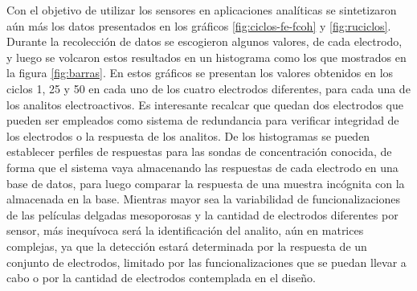 	 Con el objetivo de utilizar los sensores en aplicaciones analíticas se sintetizaron aún más los datos presentados en los gráficos \ref{fig:ciclos-fe-fcoh} y \ref{fig:ruciclos}. Durante la recolección de datos se escogieron algunos valores, de cada electrodo, y luego se volcaron estos resultados en un histograma como los que mostrados en la figura \ref{fig:barras}. En estos gráficos se presentan los valores obtenidos en los ciclos 1, 25 y 50 en cada uno de los cuatro electrodos diferentes, para cada una de los analitos electroactivos. Es interesante recalcar que quedan dos electrodos que pueden ser empleados como sistema de redundancia para verificar integridad de los electrodos o la respuesta de los analitos. De los histogramas se pueden establecer perfiles de respuestas para las sondas de concentración conocida, de forma que el sistema vaya almacenando las respuestas de cada electrodo en una base de datos, para luego comparar la respuesta de una muestra incógnita con la almacenada en la base. Mientras mayor sea la variabilidad de funcionalizaciones de las películas delgadas mesoporosas y la cantidad de electrodos diferentes por sensor, más inequívoca será la identificación del analito, aún en matrices complejas, ya que la detección estará determinada por la respuesta de un conjunto de electrodos, limitado por las funcionalizaciones que se puedan llevar a cabo o por la cantidad de electrodos contemplada en el diseño.
   		

